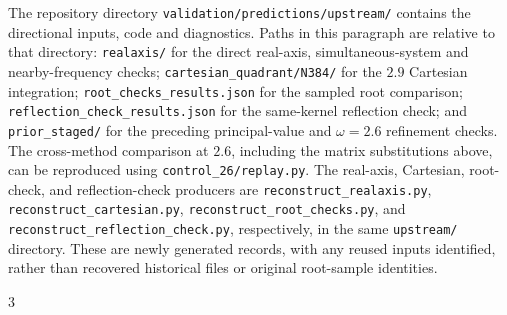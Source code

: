 \documentclass[10pt,aps,onecolumn,notitlepage,nofootinbib]{revtex4-2}
\begin{document}
The repository directory \nolinkurl{validation/predictions/upstream/} contains the directional inputs, code and diagnostics. Paths in this paragraph are relative to that directory: \texttt{realaxis/} for the direct real-axis, simultaneous-system and nearby-frequency checks; \nolinkurl{cartesian_quadrant/N384/} for the $2.9$ Cartesian integration; \nolinkurl{root_checks_results.json} for the sampled root comparison; \nolinkurl{reflection_check_results.json} for the same-kernel reflection check; and \texttt{prior\_staged/} for the preceding principal-value and $\omega=2.6$ refinement checks. The cross-method comparison at $2.6$, including the matrix substitutions above, can be reproduced using \nolinkurl{control_26/replay.py}. The real-axis, Cartesian, root-check, and reflection-check producers are \nolinkurl{reconstruct_realaxis.py}, \nolinkurl{reconstruct_cartesian.py}, \nolinkurl{reconstruct_root_checks.py}, and \nolinkurl{reconstruct_reflection_check.py}, respectively, in the same \texttt{upstream/} directory. These are newly generated records, with any reused inputs identified, rather than recovered historical files or original root-sample identities.

\begin{thebibliography}{3}

\end{thebibliography}
\end{document}
